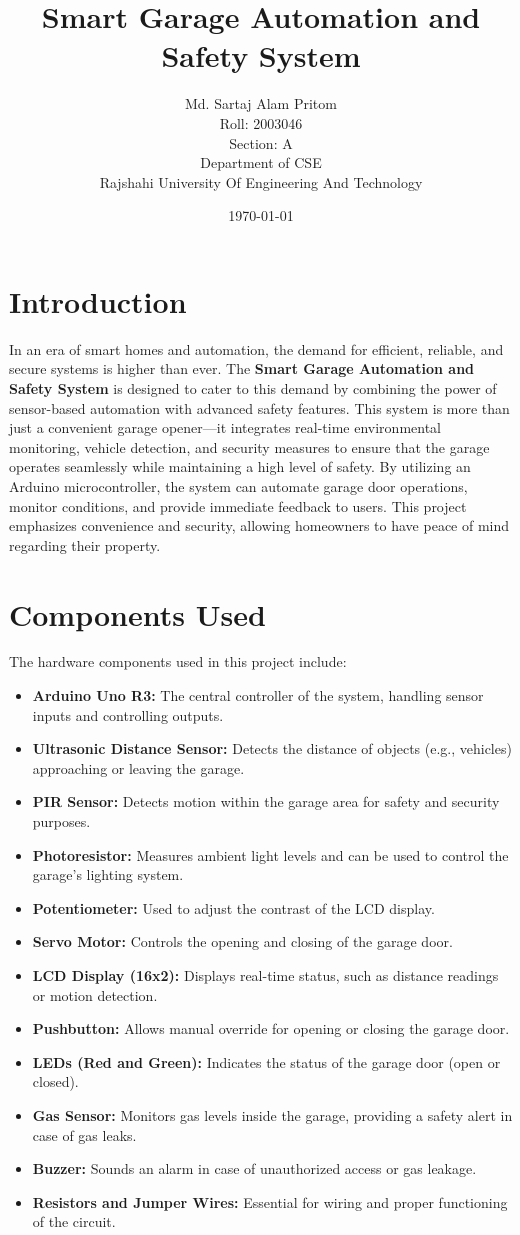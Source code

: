 \documentclass{article}
\title{\textbf{Smart Garage Automation and Safety System} \\}
\author{
    Md. Sartaj Alam Pritom \\ 
    Roll: 2003046 \\ 
    Section: A \\ 
    Department of CSE \\ 
    Rajshahi University Of Engineering And Technology\\
}
\date{\today}
\begin{document}
\maketitle

\section{Introduction}
In an era of smart homes and automation, the demand for efficient, reliable, and secure systems is higher than ever. The \textbf{Smart Garage Automation and Safety System} is designed to cater to this demand by combining the power of sensor-based automation with advanced safety features. This system is more than just a convenient garage opener—it integrates real-time environmental monitoring, vehicle detection, and security measures to ensure that the garage operates seamlessly while maintaining a high level of safety. By utilizing an Arduino microcontroller, the system can automate garage door operations, monitor conditions, and provide immediate feedback to users. This project emphasizes convenience and security, allowing homeowners to have peace of mind regarding their property.

\section{Components Used}
The hardware components used in this project include:
\begin{itemize}
    \item \textbf{Arduino Uno R3:} The central controller of the system, handling sensor inputs and controlling outputs.
    \item \textbf{Ultrasonic Distance Sensor:} Detects the distance of objects (e.g., vehicles) approaching or leaving the garage.
    \item \textbf{PIR Sensor:} Detects motion within the garage area for safety and security purposes.
    \item \textbf{Photoresistor:} Measures ambient light levels and can be used to control the garage's lighting system.
    \item \textbf{Potentiometer:} Used to adjust the contrast of the LCD display.
    \item \textbf{Servo Motor:} Controls the opening and closing of the garage door.
    \item \textbf{LCD Display (16x2):} Displays real-time status, such as distance readings or motion detection.
    \item \textbf{Pushbutton:} Allows manual override for opening or closing the garage door.
    \item \textbf{LEDs (Red and Green):} Indicates the status of the garage door (open or closed).
    \item \textbf{Gas Sensor:} Monitors gas levels inside the garage, providing a safety alert in case of gas leaks.
    \item \textbf{Buzzer:} Sounds an alarm in case of unauthorized access or gas leakage.
    \item \textbf{Resistors and Jumper Wires:} Essential for wiring and proper functioning of the circuit.
\end{itemize}
\end{document}
